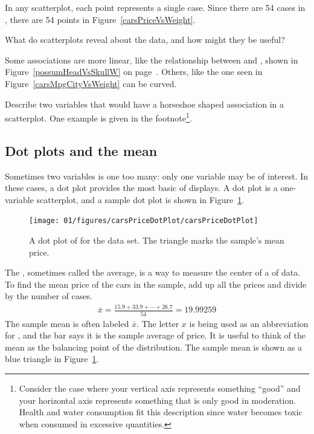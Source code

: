In any scatterplot, each point represents a single case. Since there are 54 cases in , there are 54 points in Figure~\ref{carsPriceVsWeight}.

\begin{exercise}
What do scatterplots reveal about the data, and how might they be useful?
\end{exercise}

Some associations are more linear, like the relationship between  and , shown in Figure~\ref{possumHeadVsSkullW} on page~\pageref{possumHeadVsSkullW}. Others, like the one seen in Figure~\ref{carsMpgCityVsWeight} can be curved.

\begin{exercise}
Describe two variables that would have a horseshoe shaped association in a scatterplot. One example is given in the footnote\footnote{Consider the case where your vertical axis represents something ``good'' and your horizontal axis represents something that is only good in moderation. Health and water consumption fit this description since water becomes toxic when consumed in excessive quantities.}.
\end{exercise}

\subsection{Dot plots and the mean}
\label{dotPlot}

Sometimes two variables is one too many: only one variable may be of interest. In these cases, a dot plot provides the most basic of displays. A dot plot is a one-variable scatterplot, and a sample dot plot is shown in Figure~\ref{carsPriceDotPlot}.
\begin{figure}[h]
   \centering
   \texttt{[image: 01/figures/carsPriceDotPlot/carsPriceDotPlot]}
   \caption{A dot plot of  for the  data set. The triangle marks the sample's mean price.}
   \label{carsPriceDotPlot}
\end{figure}

The , sometimes called the average, is a way to measure the center of a  of data. To find the mean price of the cars in the sample, add up all the prices and divide by the number of cases.
\begin{eqnarray}
\bar{x} = \frac{15.9 + 33.9 + \cdots + 26.7}{54} = 19.99259
\label{sampleMeanEquation}
\end{eqnarray}
The sample mean is often labeled $\bar{x}$. The letter $x$ is being used as an abbreviation for , and the bar says it is the sample average of price. It is useful to think of the mean as the balancing point of the distribution. The sample mean is shown as a blue triangle in Figure~\ref{carsPriceDotPlot}.

